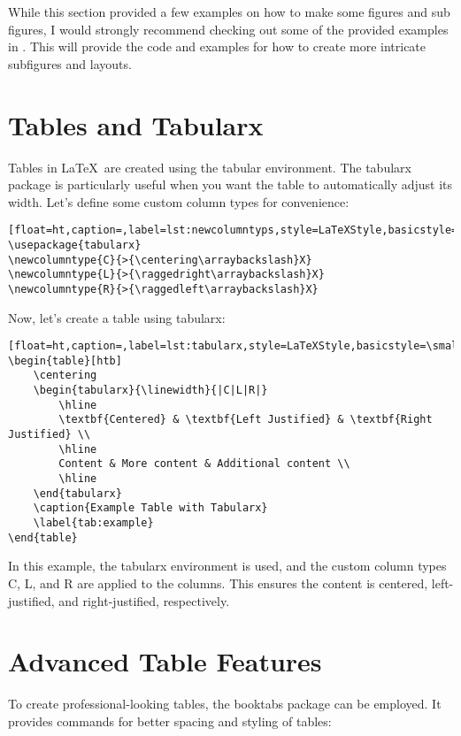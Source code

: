 		While this section provided a few examples on how to make some figures and sub figures, I would strongly recommend checking out some of the provided examples in .
		This will provide the code and examples for how to create more intricate subfigures and layouts.
		
	\section{Tables and Tabularx}
		Tables in \LaTeX\ are created using the tabular environment. 
		The tabularx package is particularly useful when you want the table to automatically adjust its width. 
		Let's define some custom column types for convenience:

		\begin{lstlisting}[float=ht,caption=,label=lst:newcolumntyps,style=LaTeXStyle,basicstyle=\small\ttfamily,]
\usepackage{tabularx}
\newcolumntype{C}{>{\centering\arraybackslash}X}
\newcolumntype{L}{>{\raggedright\arraybackslash}X}
\newcolumntype{R}{>{\raggedleft\arraybackslash}X}
		\end{lstlisting}
Now, let's create a table using tabularx:
\begin{lstlisting}[float=ht,caption=,label=lst:tabularx,style=LaTeXStyle,basicstyle=\small\ttfamily,]
\begin{table}[htb]
	\centering
	\begin{tabularx}{\linewidth}{|C|L|R|}
		\hline
		\textbf{Centered} & \textbf{Left Justified} & \textbf{Right Justified} \\
		\hline
		Content & More content & Additional content \\
		\hline
	\end{tabularx}
	\caption{Example Table with Tabularx}
	\label{tab:example}
\end{table}
		\end{lstlisting}

		In this example, the tabularx environment is used, and the custom column types C, L, and R are applied to the columns. 
		This ensures the content is centered, left-justified, and right-justified, respectively.

	\section{Advanced Table Features}

		To create professional-looking tables, the booktabs package can be employed. 
		It provides commands for better spacing and styling of tables:

